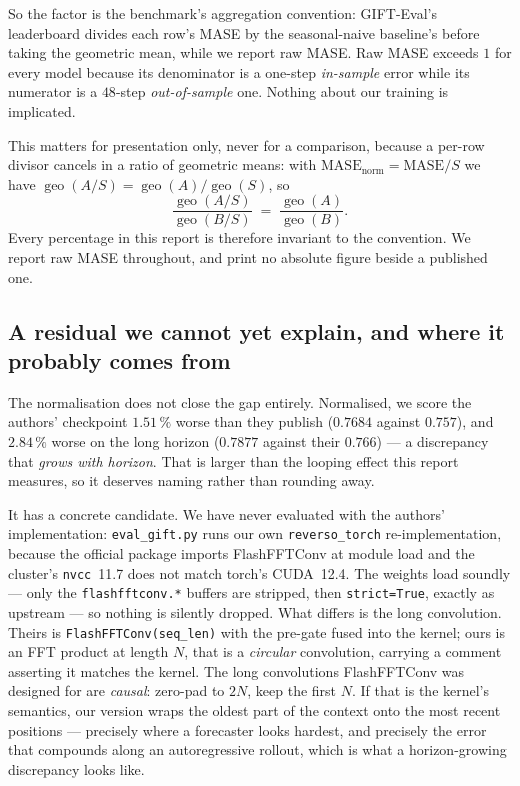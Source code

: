 So the factor is the benchmark's aggregation convention: GIFT-Eval's
leaderboard divides each row's MASE by the seasonal-naive baseline's before
taking the geometric mean, while we report raw MASE. Raw MASE exceeds $1$ for
every model because its denominator is a one-step \emph{in-sample} error while
its numerator is a $48$-step \emph{out-of-sample} one. Nothing about our
training is implicated.

This matters for presentation only, never for a comparison, because a per-row
divisor cancels in a ratio of geometric means: with
$\mathrm{MASE}_{\text{norm}} = \mathrm{MASE}/S$ we have
$\operatorname{geo}(A/S) = \operatorname{geo}(A)/\operatorname{geo}(S)$, so
\[
  \frac{\operatorname{geo}(A/S)}{\operatorname{geo}(B/S)}
  \;=\; \frac{\operatorname{geo}(A)}{\operatorname{geo}(B)} .
\]
Every percentage in this report is therefore invariant to the convention. We
report raw MASE throughout, and print no absolute figure beside a published
one.

\subsection{A residual we cannot yet explain, and where it probably comes from}
\label{sec:background:backend}

The normalisation does not close the gap entirely. Normalised, we score the
authors' checkpoint $1.51\,\%$ worse than they publish ($0.7684$ against
$0.757$), and $2.84\,\%$ worse on the long horizon ($0.7877$ against their
$0.766$) --- a discrepancy that \emph{grows with horizon}. That is larger than
the looping effect this report measures, so it deserves naming rather than
rounding away.

It has a concrete candidate. We have never evaluated with the authors'
implementation: \texttt{eval\_gift.py} runs our own \texttt{reverso\_torch}
re-implementation, because the official package imports FlashFFTConv at module
load and the cluster's \texttt{nvcc}~11.7 does not match torch's CUDA~12.4. The
weights load soundly --- only the \texttt{flashfftconv.*} buffers are stripped,
then \texttt{strict=True}, exactly as upstream --- so nothing is silently
dropped. What differs is the long convolution. Theirs is
\texttt{FlashFFTConv(seq\_len)} with the pre-gate fused into the kernel; ours is
an FFT product at length $N$, that is a \emph{circular} convolution, carrying a
comment asserting it matches the kernel. The long convolutions FlashFFTConv was
designed for are \emph{causal}: zero-pad to $2N$, keep the first $N$. If that is
the kernel's semantics, our version wraps the oldest part of the context onto
the most recent positions --- precisely where a forecaster looks hardest, and
precisely the error that compounds along an autoregressive rollout, which is
what a horizon-growing discrepancy looks like.


